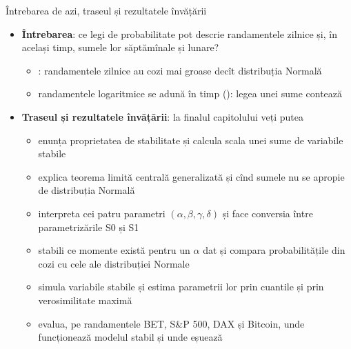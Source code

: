 \begin{frame}{Întrebarea de azi, traseul și rezultatele învățării}
\itemsize{\small}
\begin{itemize}
    \item \textbf{Întrebarea}: ce legi de probabilitate pot descrie randamentele zilnice și, în același timp, sumele lor săptămînale și lunare?
    \begin{itemize}
        \item {}: randamentele zilnice au cozi mai groase decît distribuția Normală
        \item randamentele logaritmice se adună în timp (): legea unei sume contează
    \end{itemize}
    \item \textbf{Traseul și rezultatele învățării}: la finalul capitolului veți putea
    \begin{itemize}
        \item enunța proprietatea de stabilitate și calcula scala unei sume de variabile stabile
        \item explica teorema limită centrală generalizată și cînd sumele nu se apropie de distribuția Normală
        \item interpreta cei patru parametri $(\alpha, \beta, \gamma, \delta)$ și face conversia între parametrizările S0 și S1
        \item stabili ce momente există pentru un $\alpha$ dat și compara probabilitățile din cozi cu cele ale distribuției Normale
        \item simula variabile stabile și estima parametrii lor prin cuantile și prin verosimilitate maximă
        \item evalua, pe randamentele BET, S\&P 500, DAX și Bitcoin, unde funcționează modelul stabil și unde eșuează
    \end{itemize}
\end{itemize}
\end{frame}


